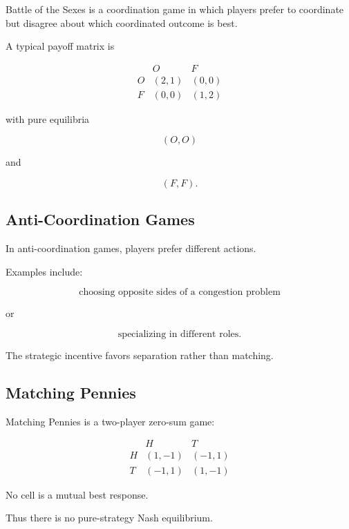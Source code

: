 Battle of the Sexes is a coordination game in which players prefer to
coordinate but disagree about which coordinated outcome is best.

A typical payoff matrix is

\[
\begin{array}{c|cc}
&
O
&
F
\\
\hline
O
&
(2,1)
&
(0,0)
\\
F
&
(0,0)
&
(1,2)
\end{array}
\]

with pure equilibria

\[
\boxed{
(O,O)
}
\]

and

\[
\boxed{
(F,F).
}
\]

\subsection{Anti-Coordination Games}
\label{subsec:anti-coordination-games}

In anti-coordination games, players prefer different actions.

Examples include:

\[
\boxed{
\text{choosing opposite sides of a congestion problem}
}
\]

or

\[
\boxed{
\text{specializing in different roles}.
}
\]

The strategic incentive favors separation rather than matching.

\subsection{Matching Pennies}
\label{subsec:matching-pennies}

Matching Pennies is a two-player zero-sum game:

\[
\begin{array}{c|cc}
&
H
&
T
\\
\hline
H
&
(1,-1)
&
(-1,1)
\\
T
&
(-1,1)
&
(1,-1)
\end{array}
\]

No cell is a mutual best response.

Thus there is no pure-strategy Nash equilibrium.

